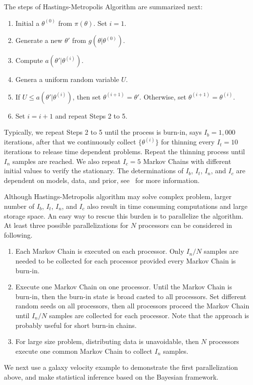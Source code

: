 The steps of Hastings-Metropolis Algorithm are summarized next:
\begin{enumerate}[align=left,label=\bfseries Step \arabic*:]
\item Initial a $\theta^{(0)}$ from $\pi(\theta)$. Set $i = 1$.

\item Generate a new $\theta'$ from $g(\theta | \theta^{(0)})$.

\item Compute $a(\theta' | \theta^{(i)})$.

\item Genera a uniform random variable $U$.

\item If $U \leq a(\theta' | \theta^{(i)})$, then set
      $\theta^{(i + 1)} = \theta'$. Otherwise, set
      $\theta^{(i + 1)} = \theta^{(i)}$.

\item Set $i = i + 1$ and repeat Steps 2 to 5.
\end{enumerate}
Typically, we repeat Steps 2 to 5 until the process is burn-in, says
$I_b = 1,000$ iterations, after that we continuously collect $\{\theta^{(i)}\}$
for thinning every $I_t = 10$ iterations to release time dependent problems.
Repeat the thinning process until $I_n$ samples are reached. We also repeat
$I_c = 5$ Markov Chains with different initial values to verify the stationary.
The determinations of $I_b$, $I_t$, $I_n$,  and $I_c$ are dependent on models,
data, and prior, see~\citet{winbugs} for more information.

Although Hastings-Metropolis algorithm may solve complex problem, larger
number of $I_b$, $I_t$, $I_n$, and $I_c$ also result in time consuming
computations and large storage space. An easy way to rescue this burden is to
parallelize the algorithm. At least three possible parallelizations for $N$
processors can be considered in following.
\begin{enumerate}
\item Each Markov Chain is executed on each processor.
      Only $I_n / N$ samples are needed to be collected for each processor
      provided every Markov Chain is burn-in.
\item Execute one Markov Chain on one processor. Until the Markov Chain
      is burn-in, then the burn-in state is broad casted to all processors.
      Set different random seeds on all processors, then all processors
      proceed the Markov Chain until $I_n / N$ samples are collected for each
      processor.
      Note that the approach is probably useful for short burn-in chains.
\item For large size problem, distributing data is unavoidable, then $N$
      processors execute one common Markov Chain to collect $I_n$ samples.
\end{enumerate}
We next use a galaxy velocity example to demonstrate the first
parallelization above, and make statistical inference based on the
Bayesian framework.


